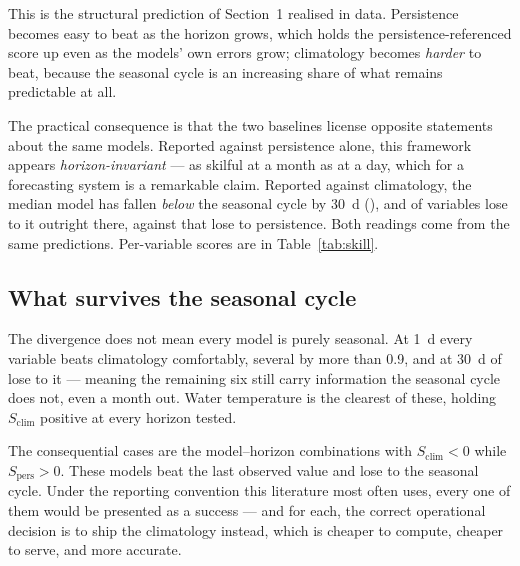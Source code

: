 This is the structural prediction of Section~1 realised in data. Persistence
becomes easy to beat as the horizon grows, which holds the persistence-referenced
score up even as the models' own errors grow; climatology becomes \emph{harder}
to beat, because the seasonal cycle is an increasing share of what remains
predictable at all.

The practical consequence is that the two baselines license opposite statements
about the same models. Reported against persistence alone, this framework
appears \emph{horizon-invariant} --- as skilful at a month as at a day, which
for a forecasting system is a remarkable claim. Reported against climatology,
the median model has fallen \emph{below} the seasonal cycle by \SI{30}{\day}
(\MedSkillCThirty{}), and \NLoseClimThirty{} of \NVars{} variables lose to it
outright there, against \NLosePersThirty{} that lose to persistence. Both
readings come from the same predictions. Per-variable scores are in
Table~\ref{tab:skill}.

\begin{wtable}[tb]
\centering
\caption{Skill against persistence ($S_{\mathrm{p}}$) and against climatology
($S_{\mathrm{c}}$) at each horizon. Bold marks a negative score --- the
baseline winning. Reading across a row shows the divergence; reading down the
$S_{\mathrm{c}}$ columns shows it is systematic.}
\label{tab:skill}
\tabscale

\end{wtable}

\subsection{What survives the seasonal cycle}

The divergence does not mean every model is purely seasonal. At \SI{1}{\day}
every variable beats climatology comfortably, several by more than 0.9, and at
\SI{30}{\day} \NLoseClimThirty{} of \NVars{} lose to it --- meaning the
remaining six still carry information the seasonal cycle does not, even a month
out. Water temperature is the clearest of these, holding $S_{\mathrm{clim}}$
positive at every horizon tested.

The consequential cases are the \NLoseToClim{} model--horizon combinations with
$S_{\mathrm{clim}} < 0$ while $S_{\mathrm{pers}} > 0$. These models beat the
last observed value and lose to the seasonal cycle. Under the reporting
convention this literature most often uses, every one of them would be
presented as a success --- and for each, the correct operational decision is to
ship the climatology instead, which is cheaper to compute, cheaper to serve,
and more accurate.

